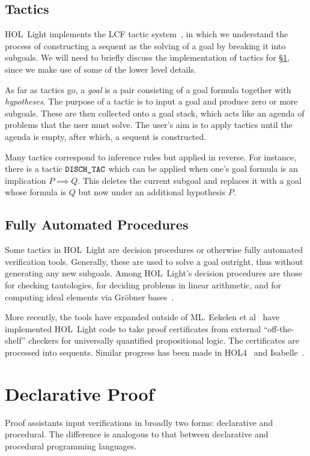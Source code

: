 \subsection{Tactics}
HOL~Light implements the LCF tactic system~\cite{Tactics}, in which we understand the process of constructing a sequent as the solving of a goal by breaking it into subgoals. We will need to briefly discuss the implementation of tactics for \S\ref{sec:DeclarativeProof}, since we make use of some of the lower level details.

As far as tactics go, a \emph{goal} is a pair consisting of a goal formula together with \emph{hypotheses}. The purpose of a tactic is to input a goal and produce zero or more subgoals. These are then collected onto a goal stack, which acts like an agenda of problems that the user must solve. The user's aim is to apply tactics until the agenda is empty, after which, a sequent is constructed.

Many tactics correspond to inference rules but applied in reverse. For instance, there is a tactic $\texttt{DISCH\_TAC}$ which can be applied when one's goal formula is an implication $P \implies Q$. This deletes the current subgoal and replaces it with a goal whose formula is $Q$ but now under an additional hypothesis $P$.

\subsection{Fully Automated Procedures}
Some tactics in HOL~Light are decision procedures or otherwise fully automated verification tools. Generally, these are used to solve a goal outright, thus without generating any new subgoals. Among HOL~Light's decision procedures are those for checking tautologies, for deciding problems in linear arithmetic, and for computing ideal elements via Gr\"{o}bner bases~\cite{BuchbergerGrobner}.

More recently, the tools have expanded outside of ML. Eekelen et al~\cite{HOLLightBoolean} have implemented HOL~Light code to take proof certificates from external ``off-the-shelf'' checkers for universally quantified propositional logic. The certificates are processed into sequents. Similar progress has been made in HOL4~\cite{HOLBoolean} and Isabelle~\cite{IsabelleSledgehammer}.

\section{Declarative Proof}\label{sec:DeclarativeProof}
Proof assistants input verifications in broadly two forms: declarative and procedural. The difference is analogous to that between declarative and procedural programming languages. 

